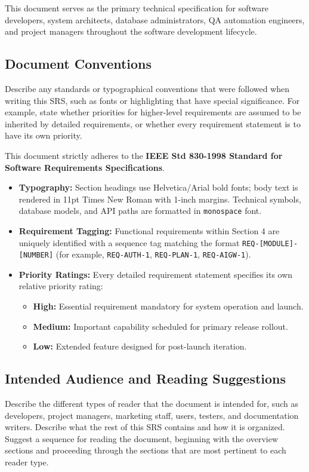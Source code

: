 \documentclass[11pt,a4paper]{article}
\begin{document}
This document serves as the primary technical specification for software developers, system architects, database administrators, QA automation engineers, and project managers throughout the software development lifecycle.

\subsection{Document Conventions}
Describe any standards or typographical conventions that were followed when writing this SRS, such as fonts or highlighting that have special significance. For example, state whether priorities for higher-level requirements are assumed to be inherited by detailed requirements, or whether every requirement statement is to have its own priority.

This document strictly adheres to the \textbf{IEEE Std 830-1998 Standard for Software Requirements Specifications}.
\begin{itemize}
    \item \textbf{Typography:} Section headings use Helvetica/Arial bold fonts; body text is rendered in 11pt Times New Roman with 1-inch margins. Technical symbols, database models, and API paths are formatted in \texttt{monospace} font.
    \item \textbf{Requirement Tagging:} Functional requirements within Section 4 are uniquely identified with a sequence tag matching the format \texttt{REQ-[MODULE]-[NUMBER]} (for example, \texttt{REQ-AUTH-1}, \texttt{REQ-PLAN-1}, \texttt{REQ-AIGW-1}).
    \item \textbf{Priority Ratings:} Every detailed requirement statement specifies its own relative priority rating:
    \begin{itemize}
        \item \textbf{High:} Essential requirement mandatory for system operation and launch.
        \item \textbf{Medium:} Important capability scheduled for primary release rollout.
        \item \textbf{Low:} Extended feature designed for post-launch iteration.
    \end{itemize}
\end{itemize}

\subsection{Intended Audience and Reading Suggestions}
Describe the different types of reader that the document is intended for, such as developers, project managers, marketing staff, users, testers, and documentation writers. Describe what the rest of this SRS contains and how it is organized. Suggest a sequence for reading the document, beginning with the overview sections and proceeding through the sections that are most pertinent to each reader type.
\end{document}
